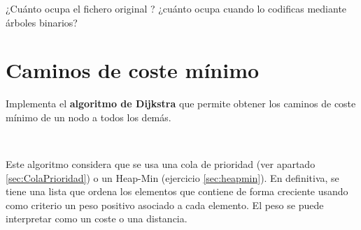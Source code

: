 ¿Cuánto ocupa el fichero original ? ¿cuánto ocupa cuando lo codificas mediante árboles binarios?   



%




\separacion
\section{Caminos de coste mínimo} 

Implementa el \textbf{algoritmo de Dijkstra} que permite obtener los caminos de coste mínimo de un nodo a todos los demás. 


\


Este algoritmo considera que se usa una cola de prioridad (ver apartado \ref{sec:ColaPrioridad}) o un Heap-Min (ejercicio \ref{sec:heapmin}). En definitiva, se tiene una lista que ordena los elementos que contiene de forma creciente usando como criterio un peso positivo asociado a cada elemento. El peso se puede interpretar como un coste o una distancia. 


